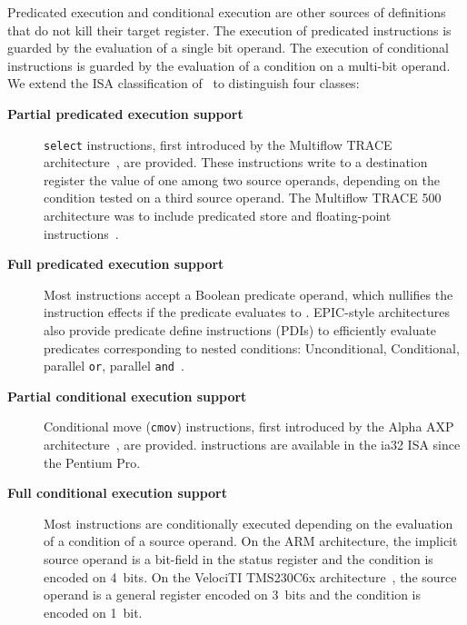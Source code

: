 Predicated execution and conditional execution are other sources of definitions
that do not kill their target register. The execution of predicated instructions
is guarded by the evaluation of a single bit operand. The execution of
conditional instructions is guarded by the evaluation of a condition on a
multi-bit operand. We extend the ISA classification of~\cite{Mahlke:1995:ISCA}
to distinguish four classes: \begin{description}

\item[\textbf{Partial predicated execution support}] \texttt{select} instructions, first
introduced by the Multiflow TRACE architecture~\cite{Colwell:1987:ASPLOS}, are
provided. These instructions write to a destination register the value of one
among two source operands, depending on the condition tested on a third source
operand. The Multiflow TRACE 500 architecture was to include predicated store
and floating-point instructions~\cite{Lowney:1993:JS}.

\item[\textbf{Full predicated execution support}] Most instructions accept a Boolean
predicate operand, which nullifies the instruction effects if the predicate
evaluates to \false. EPIC-style architectures also provide predicate define
instructions (PDIs) to efficiently evaluate predicates corresponding to nested
conditions: Unconditional, Conditional, parallel \texttt{or}, parallel \texttt{and}~\cite{Gillies:1996:MICRO}.

\item[\textbf{Partial conditional execution support}] Conditional move (\texttt{cmov})
instructions, first introduced by the Alpha AXP architecture~\cite{Blickstein:1992:DTJ}, are provided.  instructions are available in the
ia32 ISA since the Pentium Pro.

\item[\textbf{Full conditional execution support}] Most instructions are
conditionally executed depending on the evaluation of a condition of a source
operand. On the ARM architecture, the implicit source operand is a bit-field in
the status register and the condition is encoded on 4~bits. On the
VelociTI{\texttrademark} TMS230C6x architecture~\cite{Seshan:1998:IEEESPM}, the
source operand is a general register encoded on 3~bits and the condition is
encoded on 1~bit.

\end{description}


